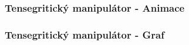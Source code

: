 \begin{frame}
	\frametitle{Tensegritický manipulátor - Animace}
	\begin{figure}
		\centering
	\end{figure}
\end{frame}

\begin{frame}
	\frametitle{Tensegritický manipulátor - Graf}
	
\end{frame}